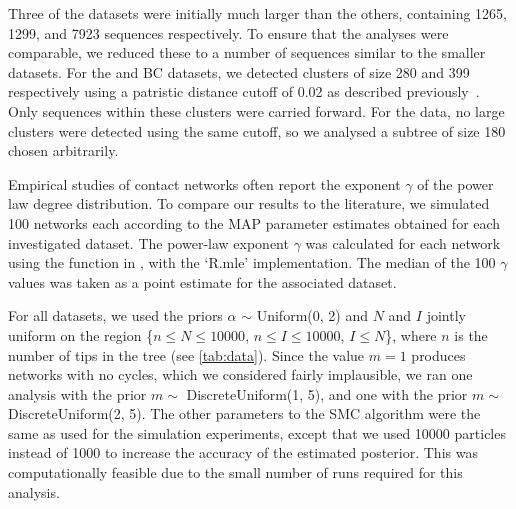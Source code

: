 Three of the datasets \autocite[][and the BC data]{li2015hiv,novitsky2014impact}
were initially much larger than the others, containing 1265, 1299, and 7923
sequences respectively. To ensure that the analyses were comparable, we reduced
these to a number of sequences similar to the smaller datasets. For the
\citeauthor{li2015hiv} and BC datasets, we detected clusters of size 280 and
399 respectively using a patristic distance cutoff of 0.02 as described
previously~\autocite{poon2015impact}. Only sequences within these clusters were
carried forward. For the \textcite{novitsky2014impact} data, no large clusters
were detected using the same cutoff, so we analysed a subtree of size 180
chosen arbitrarily.

Empirical studies of contact networks often report the exponent $\gamma$ of the
power law degree distribution. To compare our results to the literature, we
simulated 100 networks each according to the \gls{MAP} parameter estimates
obtained for each investigated dataset. The power-law exponent $\gamma$ was
calculated for each network using the  function in
, with the `R.mle' implementation. The median of the 100
$\gamma$ values was taken as a point estimate for the associated dataset.

For all datasets, we used the priors $\alpha$ $\sim$ Uniform(0, 2) and $N$ and
$I$ jointly uniform on the region \{$n \leq N \leq 10000$, $n \leq I \leq
10000$, $I \leq N$\}, where $n$ is the number of tips in the tree (see
\cref{tab:data}). Since the value $m = 1$ produces networks with no cycles,
which we considered fairly implausible, we ran one analysis with the prior $m
\sim$ DiscreteUniform(1, 5), and one with the prior $m \sim$ DiscreteUniform(2,
5). The other parameters to the SMC algorithm were the same as used for the
simulation experiments, except that we used 10000 particles instead of 1000 to
increase the accuracy of the estimated posterior. This was computationally
feasible due to the small number of runs required for this analysis.
